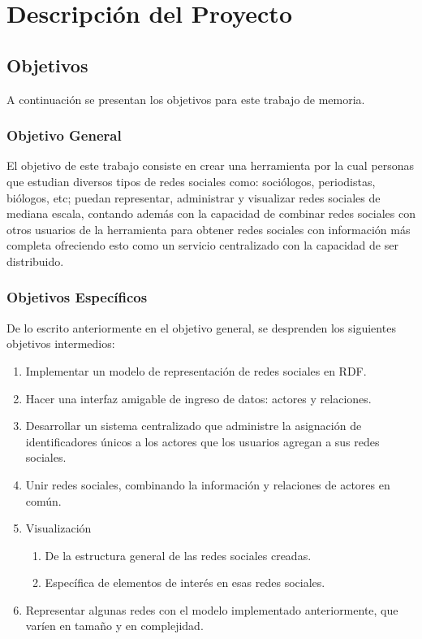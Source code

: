 \chapter{Descripción del Proyecto}
\label{chap:descripcion_proyecto}

\section{Objetivos} %
\label{sec:objetivos}
A continuación se presentan los objetivos para este trabajo de memoria.

\subsection{Objetivo General} %
\label{sub:objetivo_general}

El objetivo de este trabajo consiste en crear una herramienta por la cual personas que estudian diversos tipos de redes
sociales como: sociólogos, periodistas, biólogos, etc; puedan representar, administrar y visualizar redes sociales
de mediana escala, contando además con la capacidad de combinar redes sociales con otros usuarios de la herramienta
para obtener redes sociales con información más completa ofreciendo esto como un servicio centralizado con la
capacidad de ser distribuido.


\subsection{Objetivos Específicos} %
\label{sub:objetivos_especificos}

De lo escrito anteriormente en el objetivo general, se desprenden los siguientes objetivos intermedios:

  \begin{enumerate}
    \item Implementar un modelo de representación de redes sociales en RDF.
    \item Hacer una interfaz amigable de ingreso de datos: actores y relaciones.
    \item Desarrollar un sistema centralizado que administre la asignación de identificadores únicos a los actores que los usuarios agregan a sus redes sociales.
    \item Unir redes sociales, combinando la información y relaciones de actores en común.
    \item Visualización
      \begin{enumerate}
        \item De la estructura general de las redes sociales creadas.
        \item Específica de elementos de interés en esas redes sociales.
      \end{enumerate}
    \item Representar algunas redes con el modelo implementado anteriormente, que varíen en tamaño y en complejidad.
  \end{enumerate}

